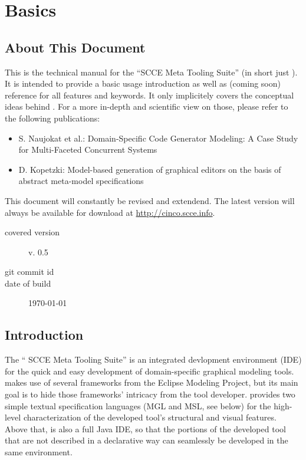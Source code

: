 \documentclass[a4paper,american,12pt]{scrreprt}
\begin{document}
\chapter{Basics}

\section{About This Document}

This is the technical manual for the ``\cinco SCCE Meta Tooling Suite'' (in
short just \cinco). It is intended to provide a basic usage introduction as
well as (coming soon) reference for all features and keywords. It only implicitely covers the
conceptual ideas behind \cinco. For a more in-depth and scientific view on those,
please refer to the following publications:
%
\begin{itemize}
\item S. Naujokat et al.: Domain-Specific Code Generator Modeling: A Case Study for
Multi-Faceted Concurrent Systems \cite{NaTISL2014}
\item D. Kopetzki: Model-based generation of graphical editors on
the basis of abstract meta-model specifications \cite{Kopetz2014}
\end{itemize}

This document will constantly be revised and extendend. The latest version will
always be available for download at \url{http://cinco.scce.info}. 

\begin{description}
\item[covered version] \cinco v. 0.5
\item[git commit id] \gitAbbrevHash{}
\item[date of build] \today
\end{description}

\section{Introduction}

The ``\cinco{} SCCE Meta Tooling Suite'' is an integrated devlopment environment
(IDE) for the quick and easy development of domain-specific graphical modeling
tools. \cinco{} makes use of several frameworks from the Eclipse Modeling
Project, but its main goal is to hide those frameworks' intricacy from the
tool developer. \cinco{} provides two simple textual specification languages (MGL and
MSL, see below) for the high-level characterization of the developed tool's
structural and visual features. Above that, \cinco{} is also a full Java IDE, so
that the portions of the developed tool that are not described in a declarative
way can seamlessly be developed in the same environment.
\end{document}
